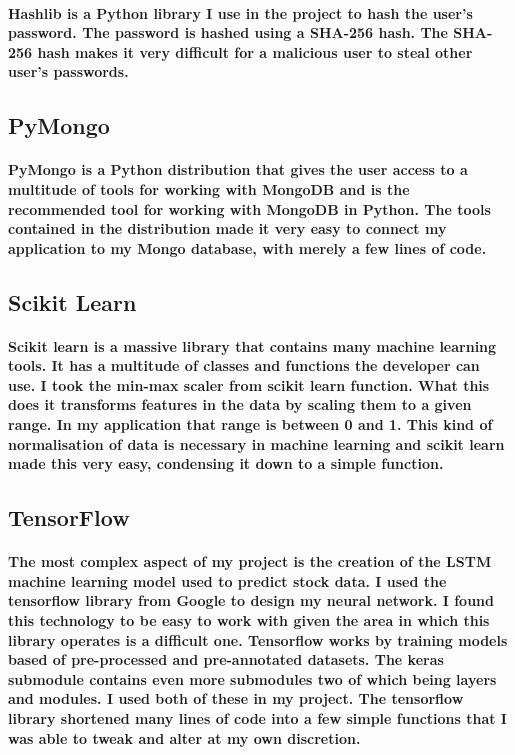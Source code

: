 \paragraph{Hashlib is a Python library I use in the project to hash the user's password. The password is hashed using a SHA-256 hash. The SHA-256 hash makes it very difficult for a malicious user to steal other user's passwords.}

\subsection{PyMongo}
\paragraph{PyMongo is a Python distribution that gives the user access to a multitude of tools for working with MongoDB and is the recommended tool for working with MongoDB in Python. The tools contained in the distribution made it very easy to connect my application to my Mongo database, with merely a few lines of code.}



\subsection{Scikit Learn}
\paragraph{Scikit learn is a massive library that contains many machine learning tools. It has a multitude of classes and functions the developer can use. I took the min-max scaler from scikit learn function. What this does it transforms features in the data by scaling them to a given range. In my application that range is between 0 and 1. This kind of normalisation of data is necessary in machine learning and scikit learn made this very easy, condensing it down to a simple function. }

\subsection{TensorFlow}
\paragraph{The most complex aspect of my project is the creation of the LSTM machine learning model used to predict stock data. I used the tensorflow library from Google to design my neural network. I found this technology to be easy to work with given the area in which this library operates is a difficult one. Tensorflow works by training models based of pre-processed and pre-annotated datasets. The keras submodule contains even more submodules two of which being layers and modules. I used both of these in my project. The tensorflow library shortened many lines of code into a few simple functions that I was able to tweak and alter at my own discretion.}

